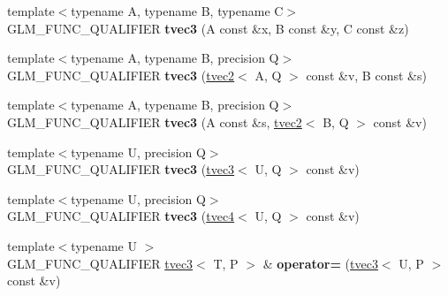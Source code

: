 \begin{DoxyCompactItemize}
\item 
{\footnotesize template$<$typename A, typename B, typename C$>$ }\\G\+L\+M\+\_\+\+F\+U\+N\+C\+\_\+\+Q\+U\+A\+L\+I\+F\+I\+ER {\bfseries tvec3} (A const \&x, B const \&y, C const \&z)\hypertarget{structglm_1_1detail_1_1tvec3_a3180ac888680910e3b6c42d77ab8c299}{}\label{structglm_1_1detail_1_1tvec3_a3180ac888680910e3b6c42d77ab8c299}

\item 
{\footnotesize template$<$typename A, typename B, precision Q$>$ }\\G\+L\+M\+\_\+\+F\+U\+N\+C\+\_\+\+Q\+U\+A\+L\+I\+F\+I\+ER {\bfseries tvec3} (\hyperlink{structglm_1_1detail_1_1tvec2}{tvec2}$<$ A, Q $>$ const \&v, B const \&s)\hypertarget{structglm_1_1detail_1_1tvec3_a3ccc7d56bdf43a20d16ea3368e068303}{}\label{structglm_1_1detail_1_1tvec3_a3ccc7d56bdf43a20d16ea3368e068303}

\item 
{\footnotesize template$<$typename A, typename B, precision Q$>$ }\\G\+L\+M\+\_\+\+F\+U\+N\+C\+\_\+\+Q\+U\+A\+L\+I\+F\+I\+ER {\bfseries tvec3} (A const \&s, \hyperlink{structglm_1_1detail_1_1tvec2}{tvec2}$<$ B, Q $>$ const \&v)\hypertarget{structglm_1_1detail_1_1tvec3_a56aa783c0a641d602097aacf8e87f63f}{}\label{structglm_1_1detail_1_1tvec3_a56aa783c0a641d602097aacf8e87f63f}

\item 
{\footnotesize template$<$typename U, precision Q$>$ }\\G\+L\+M\+\_\+\+F\+U\+N\+C\+\_\+\+Q\+U\+A\+L\+I\+F\+I\+ER {\bfseries tvec3} (\hyperlink{structglm_1_1detail_1_1tvec3}{tvec3}$<$ U, Q $>$ const \&v)\hypertarget{structglm_1_1detail_1_1tvec3_a2b833d493b5fb0bece9b26743b98fa12}{}\label{structglm_1_1detail_1_1tvec3_a2b833d493b5fb0bece9b26743b98fa12}

\item 
{\footnotesize template$<$typename U, precision Q$>$ }\\G\+L\+M\+\_\+\+F\+U\+N\+C\+\_\+\+Q\+U\+A\+L\+I\+F\+I\+ER {\bfseries tvec3} (\hyperlink{structglm_1_1detail_1_1tvec4}{tvec4}$<$ U, Q $>$ const \&v)\hypertarget{structglm_1_1detail_1_1tvec3_a85838b64a93bfabb899746fc7d3a3bb1}{}\label{structglm_1_1detail_1_1tvec3_a85838b64a93bfabb899746fc7d3a3bb1}

\item 
{\footnotesize template$<$typename U $>$ }\\G\+L\+M\+\_\+\+F\+U\+N\+C\+\_\+\+Q\+U\+A\+L\+I\+F\+I\+ER \hyperlink{structglm_1_1detail_1_1tvec3}{tvec3}$<$ T, P $>$ \& {\bfseries operator=} (\hyperlink{structglm_1_1detail_1_1tvec3}{tvec3}$<$ U, P $>$ const \&v)\hypertarget{structglm_1_1detail_1_1tvec3_addfd171b55cee5d7c2c5a1072d51ee11}{}\label{structglm_1_1detail_1_1tvec3_addfd171b55cee5d7c2c5a1072d51ee11}


\end{DoxyCompactItemize}
